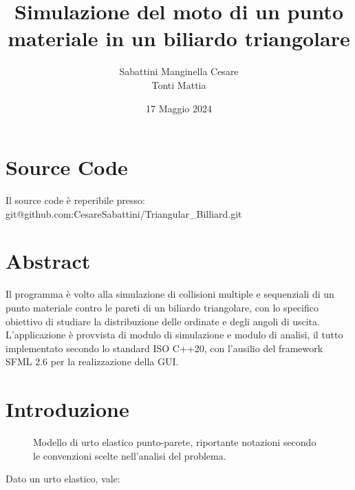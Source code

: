 \documentclass{article}
\title{Simulazione del moto di un punto materiale in un biliardo triangolare}
\author{Sabattini Manginella Cesare \\
Tonti Mattia}
\date{17 Maggio 2024}
\begin{document}
\maketitle

\section*{Source Code}
Il source code è reperibile presso:
\\git@github.com:CesareSabattini/Triangular\_Billiard.git

\section{Abstract}
Il programma è volto alla simulazione di collisioni multiple e sequenziali di un punto materiale contro le pareti
di un biliardo triangolare, con lo specifico obiettivo di studiare la distribuzione delle ordinate e degli angoli di uscita.
L'applicazione è provvista di modulo di simulazione e modulo di analisi, il tutto implementato secondo lo standard ISO C++20, con l'ausilio del framework SFML 2.6 per la realizzazione della GUI.

\section{Introduzione}


\begin{figure}[ht]
    \centering
{}
    \caption{
    \centering
Modello di urto elastico punto-parete, riportante notazioni secondo le convenzioni scelte nell'analisi del problema.
    }
    \label{fig:wavefront}

\end{figure}
Dato un urto elastico, vale:
\end{document}
